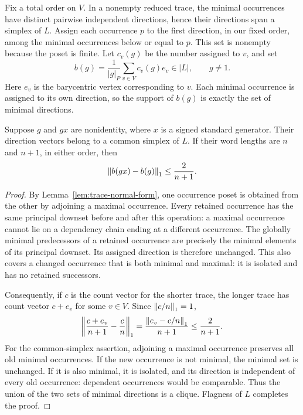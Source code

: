 Fix a total order on $V$.  In a nonempty reduced trace, the minimal
occurrences have distinct pairwise independent directions, hence
their directions span a simplex of $L$.  Assign each occurrence $p$
to the first direction, in our fixed order, among the minimal
occurrences below or equal to $p$.  This set is nonempty because the
poset is finite.  Let $c_v(g)$ be the number assigned to $v$, and set
\begin{equation}\label{eq:direction-map}
 b(g)=\frac{1}{|g|_P}\sum_{v\in V}c_v(g)e_v\in |L|,
 \qquad g\ne 1.
\end{equation}
Here $e_v$ is the barycentric vertex corresponding to $v$.
Each minimal occurrence is assigned to its own direction, so the
support of $b(g)$ is exactly the set of minimal directions.

\begin{lemma}\label{lem:trace-direction}
Suppose $g$ and $gx$ are nonidentity, where $x$ is a signed standard
generator.  Their direction vectors belong to a common simplex of
$L$.  If their word lengths are $n$ and $n+1$, in either order, then
\begin{equation}\label{eq:trace-direction-bound}
 \left\lVert b(gx)-b(g)\right\rVert_1\leq \frac{2}{n+1}.
\end{equation}
\end{lemma}

\begin{proof}
By Lemma~\ref{lem:trace-normal-form}, one occurrence poset is obtained
from the other by adjoining a maximal occurrence.  Every retained
occurrence has the same principal downset before and after this
operation: a maximal occurrence cannot lie on a dependency chain
ending at a different occurrence.  The globally minimal predecessors
of a retained occurrence are precisely the minimal elements of its
principal downset.  Its assigned direction is therefore unchanged.
This also covers a changed occurrence that is both minimal and
maximal: it is isolated and has no retained successors.

Consequently, if $c$ is the count vector for the shorter trace, the
longer trace has count vector $c+e_v$ for some $v\in V$.  Since
$\left\lVert c/n\right\rVert_1=1$,
\[
 \left\lVert\frac{c+e_v}{n+1}-\frac{c}{n}\right\rVert_1
 =\frac{\left\lVert e_v-c/n\right\rVert_1}{n+1}\leq\frac{2}{n+1}.
\]
For the common-simplex assertion, adjoining a maximal occurrence
preserves all old minimal occurrences.  If the new occurrence is
not minimal, the minimal set is unchanged.  If it is also
minimal, it is isolated, and its direction is independent of every
old occurrence: dependent occurrences would be comparable.  Thus
the union of the two sets of minimal directions is a clique.
Flagness of $L$ completes the proof.
\end{proof}

